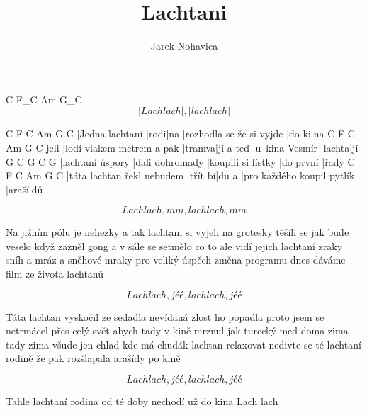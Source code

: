 \documentclass{song}
\author{Jarek Nohavica}
\title{Lachtani}
\begin{document}
   C         F_C Am        G_C
\[ |Lach lach|,   |lach lach| \]
\endstrophe

\strophe
C               F    C   Am                       G     C
|Jedna lachtaní |rodi|na |rozhodla se že si vyjde |do ki|na
     C                         F      C         Am             G      C
jeli |lodí vlakem metrem a pak |tramva|jí a teď |u~kina Vesmír |lachta|jí
G                C               G                  C         G
|lachtaní úspory |dali dohromady |koupili si lístky |do první |řady
C                          F       C     Am                         G     C
|táta lachtan řekl nebudem |třít bí|du a |pro každého koupil pytlík |araší|dů
\endstrophe

\[ Lach lach, mm, lach lach, mm \]
\endstrophe

\strophe*
Na jižním pólu je nehezky a tak lachtani si vyjeli na grotesky
těšili se jak bude veselo když zazněl gong a v sále se setmělo
co to ale vidí jejich lachtaní zraky sníh a mráz a sněhové mraky
pro veliký úspěch změna programu dnes dáváme film ze života lachtanů
\endstrophe

\[ Lach lach, jéé, lach lach, jéé \]
\endstrophe

\strophe*
Táta lachtan vyskočil ze sedadla nevídaná zlost ho popadla
proto jsem se netrmácel přes celý svět abych tady v kině mrznul jak turecký med
doma zima tady zima všude jen chlad kde má chudák lachtan relaxovat
nedivte se té lachtaní rodině že pak rozšlapala arašídy po kině
\endstrophe

\[ Lach lach, jéé, lach lach, jéé \]
\endstrophe

\strophe*
Tahle lachtaní rodina
od té doby nechodí už do kina
Lach lach
\endstrophe
\end{document}
